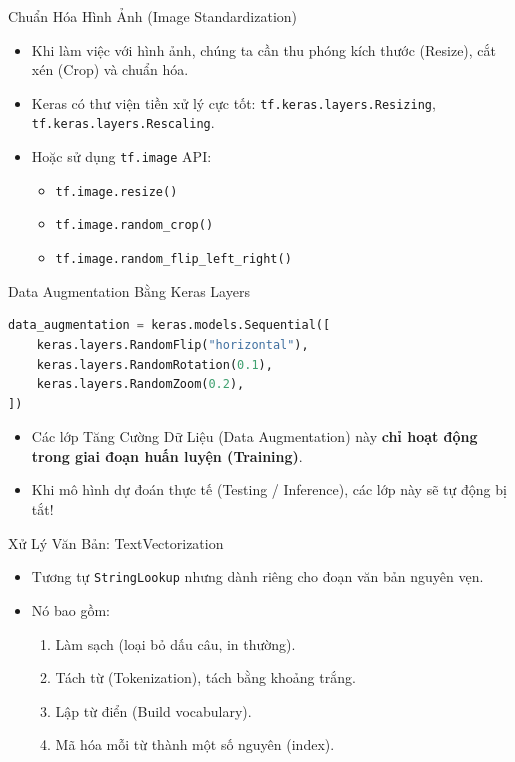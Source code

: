\documentclass[aspectratio=169]{beamer}
\begin{document}
\begin{frame}{Chuẩn Hóa Hình Ảnh (Image Standardization)}
    \begin{itemize}
        \item Khi làm việc với hình ảnh, chúng ta cần thu phóng kích thước (Resize), cắt xén (Crop) và chuẩn hóa.
        \item Keras có thư viện tiền xử lý cực tốt: \texttt{tf.keras.layers.Resizing}, \texttt{tf.keras.layers.Rescaling}.
        \item Hoặc sử dụng \texttt{tf.image} API:
        \begin{itemize}
            \item \texttt{tf.image.resize()}
            \item \texttt{tf.image.random\_crop()}
            \item \texttt{tf.image.random\_flip\_left\_right()}
        \end{itemize}
    \end{itemize}
\end{frame}

\begin{frame}[fragile]{Data Augmentation Bằng Keras Layers}
\begin{lstlisting}[language=Python]
data_augmentation = keras.models.Sequential([
    keras.layers.RandomFlip("horizontal"),
    keras.layers.RandomRotation(0.1),
    keras.layers.RandomZoom(0.2),
])
\end{lstlisting}
    \begin{itemize}
        \item Các lớp Tăng Cường Dữ Liệu (Data Augmentation) này \textbf{chỉ hoạt động trong giai đoạn huấn luyện (Training)}. 
        \item Khi mô hình dự đoán thực tế (Testing / Inference), các lớp này sẽ tự động bị tắt!
    \end{itemize}
\end{frame}

\begin{frame}{Xử Lý Văn Bản: TextVectorization}
    \begin{itemize}
        \item Tương tự \texttt{StringLookup} nhưng dành riêng cho đoạn văn bản nguyên vẹn.
        \item Nó bao gồm:
        \begin{enumerate}
            \item Làm sạch (loại bỏ dấu câu, in thường).
            \item Tách từ (Tokenization), tách bằng khoảng trắng.
            \item Lập từ điển (Build vocabulary).
            \item Mã hóa mỗi từ thành một số nguyên (index).
        \end{enumerate}
    \end{itemize}
\end{frame}
\end{document}
